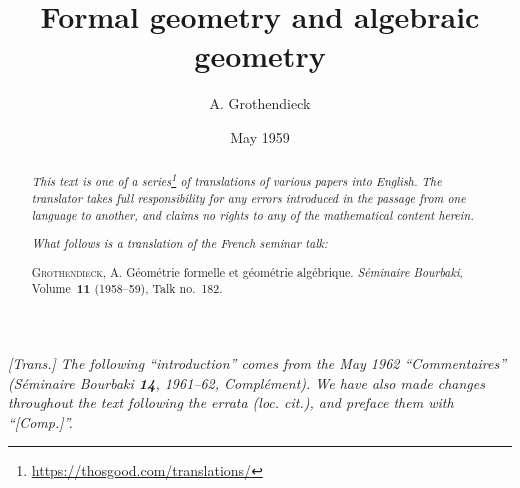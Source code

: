 \documentclass{article}
\title{Formal geometry and algebraic geometry}
\author{A. Grothendieck}
\date{May 1959}
\theoremstyle{plain}
\theoremstyle{definition}
\begin{document}
\maketitle
\thispagestyle{fancy}

\renewcommand{\abstractname}{Translator's note.}

\begin{abstract}
  \renewcommand*{\thefootnote}{\fnsymbol{footnote}}
  \emph{This text is one of a series\footnote{\url{https://thosgood.com/translations/}} of translations of various papers into English.}
  \emph{The translator takes full responsibility for any errors introduced in the passage from one language to another, and claims no rights to any of the mathematical content herein.}

  \medskip
  
  \emph{What follows is a translation of the French seminar talk:}

  \medskip\noindent
  \textsc{Grothendieck, A.}
  G\'{e}om\'{e}trie formelle et g\'{e}om\'{e}trie alg\'{e}brique.
  \emph{S\'{e}minaire Bourbaki}, Volume~\textbf{11} (1958--59), Talk no.~182.
\end{abstract}

\setcounter{footnote}{0}

\tableofcontents



\section*{}

\emph{[Trans.] The following ``introduction'' comes from the May 1962 ``Commentaires'' (\emph{S\'{e}minaire Bourbaki} \textbf{14}, 1961--62, Compl\'{e}ment). We have also made changes throughout the text following the errata (loc. cit.), and preface them with ``[Comp.]''.}
\end{document}
